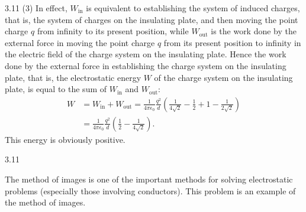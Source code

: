 \begin{solution}{3.11}
(3) In effect, $W_{\mathrm{in}}$ is equivalent to establishing the system of induced charges, that is, the system of charges on the insulating plate, and then moving the point charge $q$ from infinity to its present position, while $W_{\mathrm{out}}$ is the work done by the external force in moving the point charge $q$ from its present position to infinity in the electric field of the charge system on the insulating plate. Hence the work done by the external force in establishing the charge system on the insulating plate, that is, the electrostatic energy $W$ of the charge system on the insulating plate, is equal to the sum of $W_{\mathrm{in}}$ and $W_{\mathrm{out}}$:
\begin{align*}
W&=W_{\mathrm{in}}+W_{\mathrm{out}}
=\frac{1}{4\pi\epsilon_0}\frac{q^2}{d}
\left(\frac{1}{4\sqrt{2}}-\frac{1}{2}+1-\frac{1}{2\sqrt{2}}\right)\\
&=\frac{1}{4\pi\epsilon_0}\frac{q^2}{d}
\left(\frac{1}{2}-\frac{1}{4\sqrt{2}}\right).
\end{align*}
This energy is obviously positive.

\begin{figbox}{3.11}
\end{figbox}

\begin{commentary}
The method of images is one of the important methods for solving electrostatic problems (especially those involving conductors). This problem is an example of the method of images.
\end{commentary}
\end{solution}

